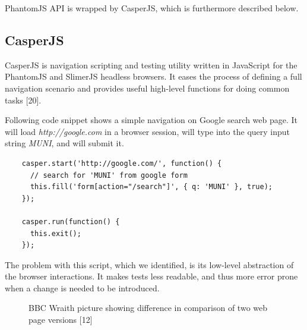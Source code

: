 \documentclass[11pt,oneside,final]{fithesis2}
\begin{document}
    PhantomJS API is wrapped by CasperJS, which is furthermore described below.
    
    \subsection{CasperJS}
    \label{subsec:casperJS}
    CasperJS is navigation scripting and testing utility written in JavaScript for the PhantomJS and SlimerJS headless browsers. It eases the process of defining a full navigation scenario 
    and provides useful high-level functions for doing common tasks [20].
    
    Following code snippet shows a simple navigation on Google search web page. It will load \textit{http://google.com} in a browser session, 
    will type into the query input string \textit{MUNI}, and will submit it.
    
    \begin{verbatim}
    casper.start('http://google.com/', function() {
      // search for 'MUNI' from google form
      this.fill('form[action="/search"]', { q: 'MUNI' }, true);
    });
   
    casper.run(function() {
      this.exit();
    });
    \end{verbatim}
    
    The problem with this script, which we identified, is its low-level abstraction of the browser interactions. It makes tests less readable, and thus more error prone when a change
    is needed to be introduced.
    
    \begin{figure}[!htb]
    \begin{center}
    \leavevmode
    \centerline{}
    \end{center}
    \caption{BBC Wraith picture showing difference in comparison of two web page versions [12]}
    \label{fig:bbcWraithDiff} 
  \end{figure}
\end{document}
